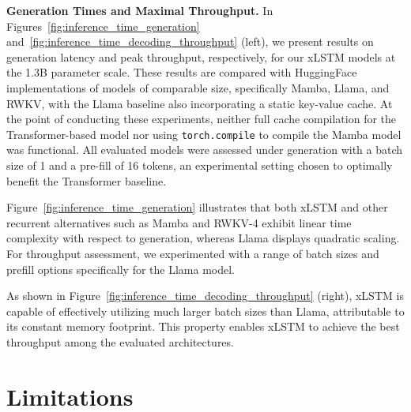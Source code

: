 \textbf{Generation Times and Maximal Throughput.} In Figures~\ref{fig:inference_time_generation} and~\ref{fig:inference_time_decoding_throughput} (left), we present results on generation latency and peak throughput, respectively, for our xLSTM models at the 1.3B parameter scale. These results are compared with HuggingFace implementations of models of comparable size, specifically Mamba, Llama, and RWKV, with the Llama baseline also incorporating a static key-value cache. At the point of conducting these experiments, neither full cache compilation for the Transformer-based model nor using \texttt{torch.compile} to compile the Mamba model was functional. All evaluated models were assessed under generation with a batch size of 1 and a pre-fill of 16 tokens, an experimental setting chosen to optimally benefit the Transformer baseline.

Figure~\ref{fig:inference_time_generation} illustrates that both xLSTM and other recurrent alternatives such as Mamba and RWKV-4 exhibit linear time complexity with respect to generation, whereas Llama displays quadratic scaling. For throughput assessment, we experimented with a range of batch sizes and prefill options specifically for the Llama model.

As shown in Figure~\ref{fig:inference_time_decoding_throughput} (right), xLSTM is capable of effectively utilizing much larger batch sizes than Llama, attributable to its constant memory footprint. This property enables xLSTM to achieve the best throughput among the evaluated architectures.

\section{Limitations}

